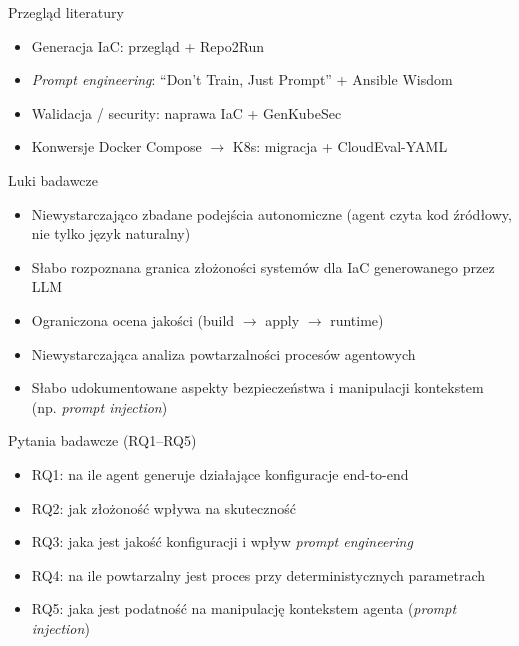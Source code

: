 \documentclass[aspectratio=169]{beamer}
\begin{document}
\begin{frame}{Przegląd literatury}
    \begin{itemize}
        \item Generacja IaC: przegląd + Repo2Run \cite{srivatsa_survey_2024,hu_llm-based_2025}
        \item \textit{Prompt engineering}: ``Don't Train, Just Prompt'' + Ansible Wisdom \cite{kratzke_dont_2024,pujar_invited_2023}
        \item Walidacja / security: naprawa IaC + GenKubeSec \cite{low_repairing_2024,malul_genkubesec_2024}
        \item Konwersje Docker Compose $\rightarrow$ K8s: migracja + CloudEval-YAML \cite{ueno_migrating_2024,xu_cloudeval-yaml_2023}
    \end{itemize}
\end{frame}

\begin{frame}{Luki badawcze}
    \begin{itemize}
        \item Niewystarczająco zbadane podejścia autonomiczne (agent czyta kod źródłowy, nie tylko język naturalny)
        \item Słabo rozpoznana granica złożoności systemów dla IaC generowanego przez LLM
        \item Ograniczona ocena jakości (build $\rightarrow$ apply $\rightarrow$ runtime)
        \item Niewystarczająca analiza powtarzalności procesów agentowych
        \item Słabo udokumentowane aspekty bezpieczeństwa i manipulacji kontekstem (np. \textit{prompt injection})
    \end{itemize}
\end{frame}

\begin{frame}{Pytania badawcze (RQ1--RQ5)}
    \begin{itemize}
        \item RQ1: na ile agent generuje działające konfiguracje end-to-end
        \item RQ2: jak złożoność wpływa na skuteczność
        \item RQ3: jaka jest jakość konfiguracji i wpływ \textit{prompt engineering}
        \item RQ4: na ile powtarzalny jest proces przy deterministycznych parametrach
        \item RQ5: jaka jest podatność na manipulację kontekstem agenta (\textit{prompt injection})
    \end{itemize}
\end{frame}
\end{document}

